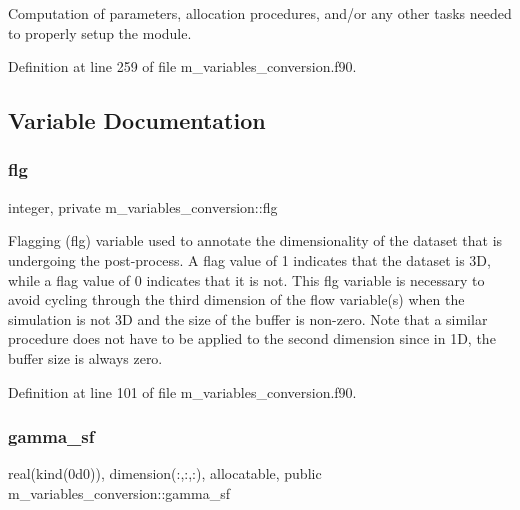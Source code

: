 Computation of parameters, allocation procedures, and/or any other tasks needed to properly setup the module. 



Definition at line 259 of file m\+\_\+variables\+\_\+conversion.\+f90.



\subsection{Variable Documentation}
\mbox{\label{namespacem__variables__conversion_adcf907c5965b8d933e502c0a7878709b}} 
\subsubsection{\texorpdfstring{flg}{flg}}
{\footnotesize\ttfamily integer, private m\+\_\+variables\+\_\+conversion\+::flg\hspace{0.3cm}{\ttfamily [private]}}



Flagging (flg) variable used to annotate the dimensionality of the dataset that is undergoing the post-\/process. A flag value of 1 indicates that the dataset is 3D, while a flag value of 0 indicates that it is not. This flg variable is necessary to avoid cycling through the third dimension of the flow variable(s) when the simulation is not 3D and the size of the buffer is non-\/zero. Note that a similar procedure does not have to be applied to the second dimension since in 1D, the buffer size is always zero. 



Definition at line 101 of file m\+\_\+variables\+\_\+conversion.\+f90.

\mbox{\label{namespacem__variables__conversion_a3a21cf2a54ae67e6a2e22f6cffb97c75}} 
\subsubsection{\texorpdfstring{gamma\+\_\+sf}{gamma\_sf}}
{\footnotesize\ttfamily real(kind(0d0)), dimension(\+:,\+:,\+:), allocatable, public m\+\_\+variables\+\_\+conversion\+::gamma\+\_\+sf}




